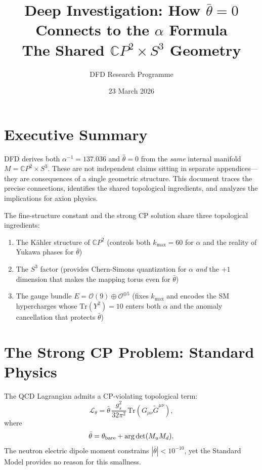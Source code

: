 \documentclass[11pt]{article}
\title{Deep Investigation: How $\bar\theta = 0$ Connects to the $\alpha$ Formula\\
\large The Shared $\mathbb{C}P^2 \times S^3$ Geometry}
\author{DFD Research Programme}
\date{23 March 2026}
\theoremstyle{remark}
\begin{document}
\maketitle

\section{Executive Summary}

DFD derives both $\alpha^{-1} = 137.036$ and $\bar\theta = 0$ from the \emph{same}
internal manifold $M = \mathbb{C}P^2 \times S^3$.  These are not independent claims
sitting in separate appendices---they are consequences of a single geometric structure.
This document traces the precise connections, identifies the shared topological
ingredients, and analyzes the implications for axion physics.

\begin{tcolorbox}[colback=green!5!white, colframe=green!50!black,
  title=Central Finding]
The fine-structure constant and the strong CP solution share three
topological ingredients:
\begin{enumerate}
\item The K\"ahler structure of $\mathbb{C}P^2$ (controls both $k_{\max} = 60$
  for $\alpha$ and the reality of Yukawa phases for $\bar\theta$)
\item The $S^3$ factor (provides Chern-Simons quantization for $\alpha$
  \emph{and} the $+1$ dimension that makes the mapping torus even for $\bar\theta$)
\item The gauge bundle $E = \mathcal{O}(9) \oplus \mathcal{O}^{\oplus 5}$
  (fixes $k_{\max}$ and encodes the SM hypercharges whose
  $\mathrm{Tr}(Y^2) = 10$ enters both $\alpha$ and the anomaly cancellation
  that protects $\bar\theta$)
\end{enumerate}
\end{tcolorbox}

\section{The Strong CP Problem: Standard Physics}

The QCD Lagrangian admits a CP-violating topological term:
\begin{equation}
\mathcal{L}_\theta = \bar\theta \,\frac{g_s^2}{32\pi^2}\,
  \mathrm{Tr}(G_{\mu\nu}\tilde G^{\mu\nu}),
\end{equation}
where
\begin{equation}
\bar\theta = \theta_{\rm bare} + \arg\det(M_u M_d).
\end{equation}
The neutron electric dipole moment constrains $|\bar\theta| < 10^{-10}$,
yet the Standard Model provides no reason for this smallness.
\end{document}
